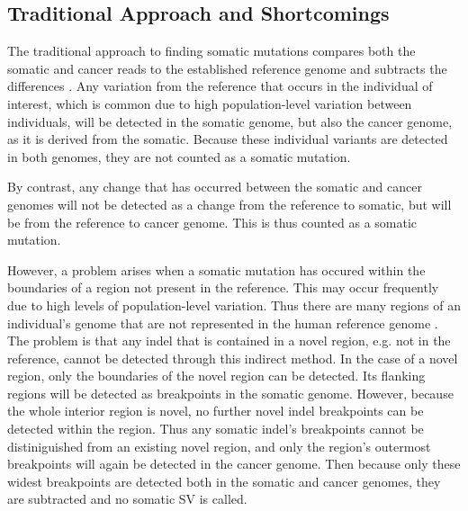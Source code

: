 \documentclass{easychithesis}
\begin{document}
\subsection{Traditional Approach and Shortcomings}
The traditional approach to finding somatic mutations compares both the somatic and cancer reads to the established reference genome and subtracts the differences \cite{schroder2014socrates, suzuki2011clipcrop, christoforides2013identification}. Any variation from the reference that occurs in the individual of interest, which is common due to high population-level variation between individuals, will be detected in the somatic genome, but also the cancer genome, as it is derived from the somatic. Because these individual variants are detected in both genomes, they are not counted as a somatic mutation.

By contrast, any change that has occurred between the somatic and cancer genomes will not be detected as a change from the reference to somatic, but will be from the reference to cancer genome. This is thus counted as a somatic mutation.

However, a problem arises when a somatic mutation has occured within the boundaries of a region not present in the reference. This may occur frequently due to high levels of population-level variation. Thus there are many regions of an individual's genome that are not represented in the human reference genome \cite{feuk2006structural}. The problem is that any indel that is contained in a novel region, e.g. not in the reference, cannot be detected through this indirect method. In the case of a novel region, only the boundaries of the novel region can be detected. Its flanking regions will be detected as breakpoints in the somatic genome. However, because the whole interior region is novel, no further novel indel breakpoints can be detected within the region. Thus any somatic indel's breakpoints cannot be distiniguished from an existing novel region, and only the region's outermost breakpoints will again be detected in the cancer genome. Then because only these widest breakpoints are detected both in the somatic and cancer genomes, they are subtracted and no somatic SV is called.
\end{document}
